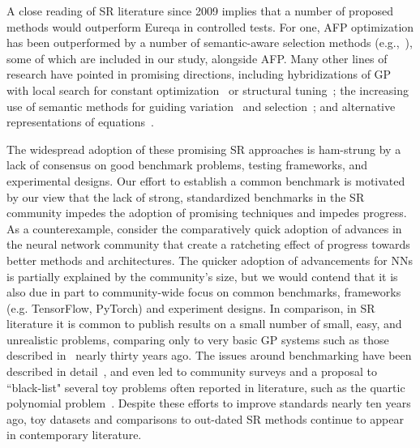 A close reading of SR literature since 2009 implies that a number of proposed methods would outperform Eureqa in controlled tests.
For one, AFP optimization has been outperformed by a number of semantic-aware selection methods (e.g.,~\cite{lacavaEpsilonLexicaseSelectionRegression2016c,liskowskiDiscoverySearchObjectives2017}), some of which are included in our study, alongside AFP.
Many other lines of research have pointed in promising directions, including hybridizations of GP with local search for constant optimization~\cite{topchyFasterGeneticProgramming2001,kommendaParameterIdentificationSymbolic2019} or structural tuning~\cite{lacavaInferenceCompactNonlinear2016}; the increasing use of semantic methods for guiding variation~\cite{moraglioGeometricSemanticGenetic2012a,virgolinLinearScalingSemantic2019} and selection~\cite{azadKrzysztofKrawiecBehavioral2017,lacavaProbabilisticMultiobjectiveAnalysis2019,arnaldoMultipleRegressionGenetic2014a}; and alternative representations of equations~\cite{defrancaInteractionTransformationEvolutionaryAlgorithm2020,mcconaghyFFXFastScalable2011}.

The widespread adoption of these promising SR approaches is ham-strung by a lack of consensus on good benchmark problems, testing frameworks, and experimental designs. 
Our effort to establish a common benchmark is motivated by our view that the lack of strong, standardized benchmarks in the SR community impedes the adoption of promising techniques and impedes progress.  
As a counterexample, consider the comparatively quick adoption of advances in the neural network community that create a ratcheting effect of progress towards better methods and architectures. 
The quicker adoption of advancements for NNs is partially explained by the community's size, but we would contend that it is also due in part to community-wide focus on common benchmarks, frameworks (e.g. TensorFlow, PyTorch) and experiment designs. 
In comparison, in SR literature it is common to publish results on a small number of small, easy, and unrealistic problems, comparing only to very basic GP systems such as those described in~\cite{kozaGeneticProgrammingProgramming1992a} nearly thirty years ago.   
The issues around benchmarking have been described in detail~\cite{mcdermottGeneticProgrammingNeeds2012b}, and even led to community surveys and a proposal to ``black-list" several toy problems often reported in literature, such as the quartic polynomial problem~\cite{whiteBetterGPBenchmarks2012a}.
Despite these efforts to improve standards nearly ten years ago, toy datasets and comparisons to out-dated SR methods continue to appear in contemporary literature.


